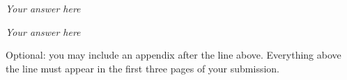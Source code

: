 \documentclass[answers]{exam}
\begin{document}
\begin{questions}

\begin{framed}
\emph{Your answer here}
\end{framed}

\begin{framed}
\emph{Your answer here}
\end{framed}
\end{questions}

\noindent \hrulefill

\noindent Optional: you may include an appendix after the line above. Everything above the line must appear in the first three pages of your submission.
\end{document}
